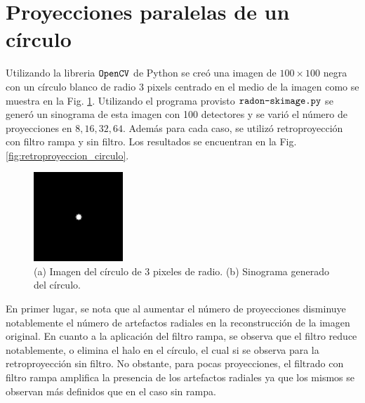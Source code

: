 \documentclass[letterpaper,12pt]{article}
\theoremstyle{plain}
\begin{document}
\section{Proyecciones paralelas de un círculo}

Utilizando la libreria $\verb|OpenCV|$ de Python se creó una imagen de $100\times100$ negra con un círculo blanco de radio $3$ pixels centrado en el medio de la imagen como se muestra en la Fig. \ref{fig:sinograma_circulo}. Utilizando el programa provisto $\verb|radon-skimage.py|$ se generó un sinograma de esta imagen con 100 detectores y se varió el número de proyecciones en $8,16,32,64$. Además para cada caso, se utilizó retroproyección con filtro rampa y sin filtro. Los resultados se encuentran en la Fig. \ref{fig:retroproyeccion_circulo}.

\begin{figure}[H]
   \centering
         \includegraphics[width=0.3\textwidth]{Figuras/sinograma_circulo.png}
   \caption{(a) Imagen del círculo de 3 pixeles de radio. (b) Sinograma generado del círculo. }
   \label{fig:sinograma_circulo}
\end{figure}

En primer lugar, se nota que al aumentar el número de proyecciones disminuye notablemente el número de artefactos radiales en la reconstrucción de la imagen original. En cuanto a la aplicación del filtro rampa, se observa que el filtro reduce notablemente, o elimina el halo en el círculo, el cual si se observa para la retroproyección sin filtro. No obstante, para pocas proyecciones, el filtrado con filtro rampa amplifica la presencia de los artefactos radiales ya que los mismos se observan más definidos que en el caso sin rampa.
\end{document}
